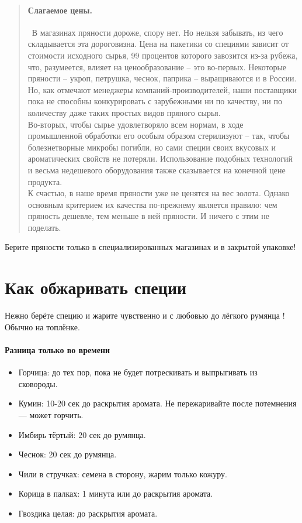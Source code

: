 \begin{quote}
{\paragraph{Слагаемое цены.}\ В магазинах пряности дороже, спору нет. Но нельзя забывать, из чего складывается эта дороговизна. Цена на пакетики со специями зависит от стоимости исходного сырья, 99 процентов которого завозится из-за рубежа, что, разумеется, влияет на ценообразование – это во-первых. Некоторые пряности – укроп, петрушка, чеснок, паприка – выращиваются и в России. Но, как отмечают менеджеры компаний-производителей, наши поставщики пока не способны конкурировать с зарубежными ни по качеству, ни по количеству даже таких простых видов пряного сырья. 
\\
Во-вторых, чтобы сырье удовлетворяло всем нормам, в ходе промышленной обработки его особым образом стерилизуют – так, чтобы болезнетворные микробы погибли, но сами специи своих вкусовых и ароматических свойств не потеряли. Использование подобных технологий и весьма недешевого оборудования также сказывается на конечной цене продукта.
\\[10pt]
К счастью, в наше время пряности уже не ценятся на вес золота. Однако основным критерием их качества по-прежнему является правило: чем пряность дешевле, тем меньше в ней пряности. И ничего с этим не поделать.
}\end{quote}

Берите пряности только в специализированных магазинах и в закрытой упаковке!

\section{Как обжаривать специи}

Нежно берёте специю и жарите чувственно и с любовью до лёгкого румянца \faHeart! 
Обычно на топлёнке.
\paragraph{Разница только во времени}
\begin{itemize}
\item Горчица: до тех пор, пока не будет потрескивать и выпрыгивать из сковороды.
\item Кумин: 10-20 сек до раскрытия аромата. Не пережаривайте после потемнения — может горчить.
\item Имбирь тёртый: 20 сек до румянца.
\item Чеснок: 20 сек до румянца.
\item Чили в стручках: семена в сторону, жарим только кожуру.
\item Корица в палках: 1 минута или до раскрытия аромата.
\item Гвоздика целая: до раскрытия аромата.
\end{itemize}

